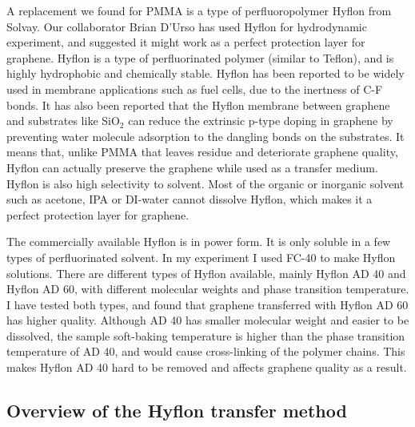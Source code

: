 \documentclass[pdflatex, sectionletters, 12pt]{pittetd}    %
\begin{document}
A replacement we found for PMMA is a type of perfluoropolymer Hyflon from Solvay. Our collaborator Brian D'Urso has used Hyflon for hydrodynamic experiment, and suggested it might work as a perfect protection layer for graphene. Hyflon is a type of perfluorinated polymer (similar to Teflon), and is highly hydrophobic and chemically stable. Hyflon has been reported to be widely used in membrane applications such as fuel cells, due to the inertness of C-F bonds\cite{arcella2005hyflon, merlo2007membrane, zhang2012recent}. It has also been reported that the Hyflon membrane between graphene and substrates like SiO$_2$ can reduce the extrinsic p-type doping in graphene by preventing water molecule adsorption to the dangling bonds on the substrates\cite{mattevi2012solution}. It means that, unlike PMMA that leaves residue and deteriorate graphene quality, Hyflon can actually preserve the graphene while used as a transfer medium. Hyflon is also high selectivity to solvent. Most of the organic or inorganic solvent such as acetone, IPA or DI-water cannot dissolve Hyflon, which makes it a perfect protection layer for graphene. 

The commercially available Hyflon is in power form. It is only soluble in a few types of perfluorinated solvent. In my experiment I used FC-40 to make Hyflon solutions. There are different types of Hyflon available, mainly Hyflon AD 40 and Hyflon AD 60, with different molecular weights and phase transition temperature. I have tested both types, and found that graphene transferred with Hyflon AD 60 has higher quality. Although AD 40 has smaller molecular weight and easier to be dissolved, the sample soft-baking temperature is higher than the phase transition temperature of AD 40, and would cause cross-linking of the polymer chains. This makes Hyflon AD 40 hard to be removed and affects graphene quality as a result. 

\subsection{Overview of the Hyflon transfer method}
\end{document}
